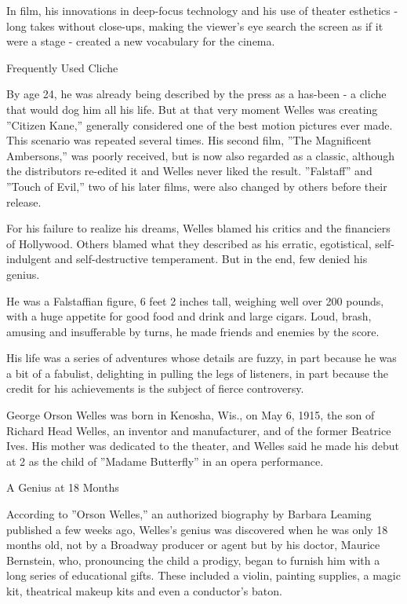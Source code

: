 In film, his innovations in deep-focus technology and his use of theater
esthetics - long takes without close-ups, making the viewer's eye search
the screen as if it were a stage - created a new vocabulary for the
cinema.

Frequently Used Cliche

By age 24, he was already being described by the press as a has-been - a
cliche that would dog him all his life. But at that very moment Welles
was creating ''Citizen Kane,'' generally considered one of the best
motion pictures ever made. This scenario was repeated several times. His
second film, ''The Magnificent Ambersons,'' was poorly received, but is
now also regarded as a classic, although the distributors re-edited it
and Welles never liked the result. ''Falstaff'' and ''Touch of Evil,''
two of his later films, were also changed by others before their
release.

For his failure to realize his dreams, Welles blamed his critics and the
financiers of Hollywood. Others blamed what they described as his
erratic, egotistical, self-indulgent and self-destructive temperament.
But in the end, few denied his genius.

He was a Falstaffian figure, 6 feet 2 inches tall, weighing well over
200 pounds, with a huge appetite for good food and drink and large
cigars. Loud, brash, amusing and insufferable by turns, he made friends
and enemies by the score.

His life was a series of adventures whose details are fuzzy, in part
because he was a bit of a fabulist, delighting in pulling the legs of
listeners, in part because the credit for his achievements is the
subject of fierce controversy.

George Orson Welles was born in Kenosha, Wis., on May 6, 1915, the son
of Richard Head Welles, an inventor and manufacturer, and of the former
Beatrice Ives. His mother was dedicated to the theater, and Welles said
he made his debut at 2 as the child of ''Madame Butterfly'' in an opera
performance.

A Genius at 18 Months

According to ''Orson Welles,'' an authorized biography by Barbara
Leaming published a few weeks ago, Welles's genius was discovered when
he was only 18 months old, not by a Broadway producer or agent but by
his doctor, Maurice Bernstein, who, pronouncing the child a prodigy,
began to furnish him with a long series of educational gifts. These
included a violin, painting supplies, a magic kit, theatrical makeup
kits and even a conductor's baton.

